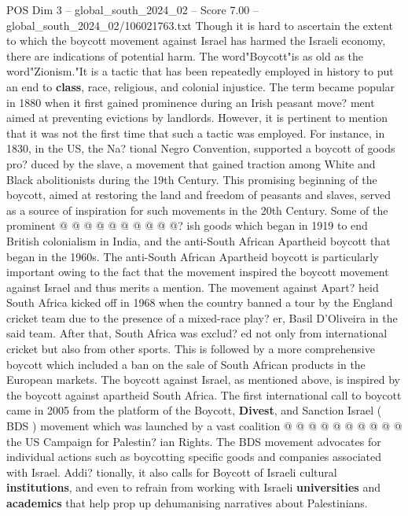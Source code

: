 \begin{textsample}{POS Dim 3 – global\_south\_2024\_02 – Score 7.00 – global\_south\_2024\_02/106021763.txt}  \label{ex:f3_pos_374}
Though it is hard to ascertain the extent to which the boycott movement against Israel has harmed the Israeli economy, there are indications of potential harm.
The word"Boycott"is as old as the word"Zionism."It is a tactic that has been repeatedly employed in history to put an end to \textbf{class}, race, religious, and colonial injustice.
The term became popular in 1880 when it first gained prominence during an Irish peasant move? ment aimed at preventing evictions by landlords.
However, it is pertinent to mention that it was not the first time that such a tactic was employed.
For instance, in 1830, in the US, the Na? tional Negro Convention, supported a boycott of goods pro? duced by the slave, a movement that gained traction among White and Black abolitionists during the 19th Century.
This promising beginning of the boycott, aimed at restoring the land and freedom of peasants and slaves, served as a source of inspiration for such movements in the 20th Century.
Some of the prominent @ @ @ @ @ @ @ @ @ @? ish goods which began in 1919 to end British colonialism in India, and the anti-South African Apartheid boycott that began in the 1960s.
The anti-South African Apartheid boycott is particularly important owing to the fact that the movement inspired the boycott movement against Israel and thus merits a mention.
The movement against Apart? heid South Africa kicked off in 1968 when the country banned a tour by the England cricket team due to the presence of a mixed-race play? er, Basil D'Oliveira in the said team.
After that, South Africa was exclud? ed not only from international cricket but also from other sports.
This is followed by a more comprehensive boycott which included a ban on the sale of South African products in the European markets.
The boycott against Israel, as mentioned above, is inspired by the boycott against apartheid South Africa.
The first international call to boycott came in 2005 from the platform of the Boycott, \textbf{Divest}, and Sanction Israel ( BDS ) movement which was launched by a vast coalition @ @ @ @ @ @ @ @ @ @ the US Campaign for Palestin? ian Rights.
The BDS movement advocates for individual actions such as boycotting specific goods and companies associated with Israel.
Addi? tionally, it also calls for Boycott of Israeli cultural \textbf{institutions}, and even to refrain from working with Israeli \textbf{universities} and \textbf{academics} that help prop up dehumanising narratives about Palestinians.

\end{textsample}

